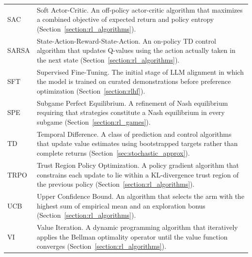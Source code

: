 \begin{longtable}{p{2.2cm} p{12cm}}
SAC & Soft Actor-Critic. An off-policy actor-critic algorithm that maximizes a combined objective of expected return and policy entropy (Section~\ref*{section:rl_algorithms}). \\[4pt]
SARSA & State-Action-Reward-State-Action. An on-policy TD control algorithm that updates Q-values using the action actually taken in the next state (Section~\ref*{section:rl_algorithms}). \\[4pt]
SFT & Supervised Fine-Tuning. The initial stage of LLM alignment in which the model is trained on curated demonstrations before preference optimization (Section~\ref*{section:rlhf}). \\[4pt]
SPE & Subgame Perfect Equilibrium. A refinement of Nash equilibrium requiring that strategies constitute a Nash equilibrium in every subgame (Section~\ref*{section:rl_games}). \\[4pt]
TD & Temporal Difference. A class of prediction and control algorithms that update value estimates using bootstrapped targets rather than complete returns (Section~\ref*{sec:stochastic_approx}). \\[4pt]
TRPO & Trust Region Policy Optimization. A policy gradient algorithm that constrains each update to lie within a KL-divergence trust region of the previous policy (Section~\ref*{section:rl_algorithms}). \\[4pt]
UCB & Upper Confidence Bound. An algorithm that selects the arm with the highest sum of empirical mean and an exploration bonus (Section~\ref*{section:rl_algorithms}). \\[4pt]
VI & Value Iteration. A dynamic programming algorithm that iteratively applies the Bellman optimality operator until the value function converges (Section~\ref*{section:rl_algorithms}). \\[4pt]
\end{longtable}
